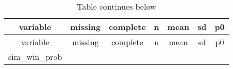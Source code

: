 \documentclass[]{article}
\begin{document}
\begin{longtable}[]{@{}ccccccc@{}}
\caption{Table continues below}\tabularnewline
\toprule
\begin{minipage}[b]{0.16\columnwidth}\centering
variable\strut
\end{minipage} & \begin{minipage}[b]{0.11\columnwidth}\centering
missing\strut
\end{minipage} & \begin{minipage}[b]{0.12\columnwidth}\centering
complete\strut
\end{minipage} & \begin{minipage}[b]{0.09\columnwidth}\centering
n\strut
\end{minipage} & \begin{minipage}[b]{0.11\columnwidth}\centering
mean\strut
\end{minipage} & \begin{minipage}[b]{0.11\columnwidth}\centering
sd\strut
\end{minipage} & \begin{minipage}[b]{0.11\columnwidth}\centering
p0\strut
\end{minipage}\tabularnewline
\midrule
\endfirsthead
\toprule
\begin{minipage}[b]{0.16\columnwidth}\centering
variable\strut
\end{minipage} & \begin{minipage}[b]{0.11\columnwidth}\centering
missing\strut
\end{minipage} & \begin{minipage}[b]{0.12\columnwidth}\centering
complete\strut
\end{minipage} & \begin{minipage}[b]{0.09\columnwidth}\centering
n\strut
\end{minipage} & \begin{minipage}[b]{0.11\columnwidth}\centering
mean\strut
\end{minipage} & \begin{minipage}[b]{0.11\columnwidth}\centering
sd\strut
\end{minipage} & \begin{minipage}[b]{0.11\columnwidth}\centering
p0\strut
\end{minipage}\tabularnewline
\midrule
\endhead
\begin{minipage}[t]{0.16\columnwidth}\centering
sim\_win\_prob\strut
\end{minipage} & \begin{minipage}[t]{0.11\columnwidth}\centering

\end{minipage}
\end{longtable}
\end{document}
